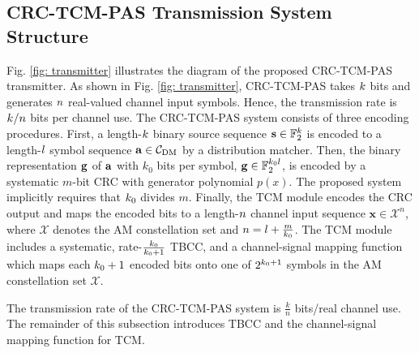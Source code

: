 \documentclass [PhD] {uclathes}
\begin{document}
\subsection{CRC-TCM-PAS Transmission System Structure}
Fig. \ref{fig: transmitter} illustrates the diagram of the proposed CRC-TCM-PAS transmitter. 
As shown in Fig. \ref{fig: transmitter}, CRC-TCM-PAS takes $k$ bits and generates $n$ real-valued channel input symbols. Hence, the transmission rate is $k/n$ bits per channel use. 
The CRC-TCM-PAS system consists of three encoding procedures. 
First, a length-$k$ binary source sequence $\mathbf{s}\in\mathbb{F}_2^{k}$ is encoded to a length-$l$ symbol sequence $\mathbf{a}\in\mathcal{C}_{\mathrm{DM}}$ by a distribution matcher. 
Then, the binary representation $\mathbf{g}$ of $\mathbf{a}$ with $k_0$ bits per symbol, $\mathbf{g}\in\mathbb{F}^{k_0l}_2$, is encoded by a systematic $m$-bit CRC with generator polynomial $p(x)$. The proposed system implicitly requires that $k_0$ divides $m$.
Finally, the TCM module encodes the CRC output and maps the encoded bits to a length-$n$ channel input sequence $\mathbf{x}\in\mathcal{X}^n$, where $\mathcal{X}$ denotes the AM constellation set and $n=l+\frac{m}{k_0}$.   
The  TCM module includes a systematic, rate-$\frac{k_0}{k_0+1}$  TBCC, and a channel-signal mapping function which maps  each $k_0+1$ encoded bits onto one of $2^{k_0+1}$ symbols in the AM constellation set $\mathcal{X}$.

The transmission rate of the CRC-TCM-PAS system is $\frac{k}{n}$ bits/real channel use. The remainder of this subsection introduces TBCC and  the channel-signal mapping function for TCM.
\end{document}
